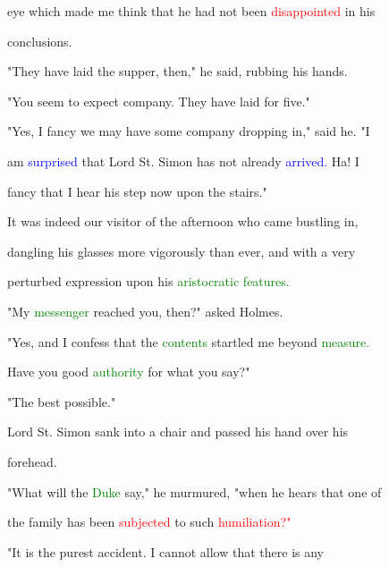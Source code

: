  eye which made me think that he had not been \textcolor{red}{disappointed} in his

 conclusions.



 "They have laid the supper, then," he said, rubbing his hands.



 "You seem to \textcolor{BurntOrange}{expect} company. They have laid for five."



 "Yes, I \textcolor{BurntOrange}{fancy} we may have some company dropping in," said he. "I

 am \textcolor{blue}{surprised} that \textcolor{BurntOrange}{Lord} St. Simon has not already \textcolor{blue}{arrived.} Ha! I

 \textcolor{BurntOrange}{fancy} that I hear his step now upon the stairs."



 It was indeed our \textcolor{BurntOrange}{visitor} of the afternoon who came bustling in,

 dangling his glasses more vigorously than ever, and with a very

 perturbed expression upon his \textcolor{green}{aristocratic} \textcolor{green}{features.}



 "My \textcolor{green}{messenger} reached you, then?" asked Holmes.



 "Yes, and I \textcolor{BurntOrange}{confess} that the \textcolor{green}{contents} \textcolor{BurntOrange}{startled} me beyond \textcolor{green}{measure.}

 Have you \textcolor{BurntOrange}{good} \textcolor{green}{authority} for what you say?"



 "The best possible."



 \textcolor{BurntOrange}{Lord} St. Simon sank into a chair and passed his hand over his

 forehead.



 "What will the \textcolor{green}{Duke} say," he murmured, "when he hears that one of

 the family has been \textcolor{red}{subjected} to such \textcolor{red}{humiliation?"}



 "It is the purest \textcolor{BurntOrange}{accident.} I cannot allow that there is any

